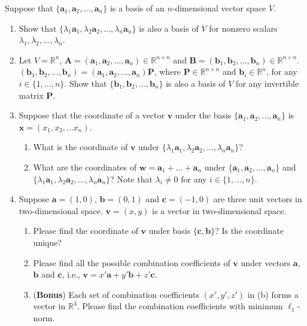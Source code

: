 \documentclass[11pt,letter,notitlepage]{article}
\theoremstyle{definition}
\begin{document}
\newpage
	\begin{exercise}
		Suppose that $\{\mathbf{a}_1, \mathbf{a}_2,\dots,\mathbf{a}_n\}$ is a basis of an $n$-dimensional vector space $V$.
		\begin{enumerate}
			\item Show that $\{\lambda_1 \mathbf{a}_1, \lambda_2 \mathbf{a}_2, \dots, \lambda_n\mathbf{a}_n\}$ is also a basis of $V$ for nonzero scalars $\lambda_1,\lambda_2, \dots, \lambda_n$.
			\item Let $V =\mathbb{R}^n$, $\mathbf{A}=(\mathbf{a}_1,\mathbf{a}_2, \dots, \mathbf{a}_n)\in\mathbb{R}^{n\times n}$ and $\mathbf{B}=(\mathbf{b}_1,\mathbf{b}_2,\dots, \mathbf{b}_n)\in\mathbb{R}^{n\times n}$. $(\mathbf{b}_1,\mathbf{b}_2,\dots, \mathbf{b}_n) = (\mathbf{a}_1,\mathbf{a}_2, \dots, \mathbf{a}_n)\mathbf{P}$, where $\mathbf{P}\in \mathbb{R}^{n\times n}$ and $\mathbf{b}_i\in \mathbb{R}^n$, for any $i\in\{1,\dots,n\}$. Show that $\{ \mathbf{b}_1, \mathbf{b}_2, \dots, \mathbf{b}_n\}$ is also a basis of $V$ for any invertible  matrix $\mathbf{P}$.
			\item Suppose that the coordinate of a vector $\mathbf{v}$ under the basis $\{\mathbf{a}_1,  \mathbf{a}_2,\dots,\mathbf{a}_n\}$ is $\mathbf{x}=(x_1,x_2,\dots x_n)$.
			\begin{enumerate}
				\item What is the coordinate of $\mathbf{v}$ under $\{\lambda_1 \mathbf{a}_1, \lambda_2 \mathbf{a}_2, \dots, \lambda_n\mathbf{a}_n\}$?
				
				\item What are the coordinates of $\mathbf{w} = \mathbf{a}_1+\dots + \mathbf{a}_n$ under $\{\mathbf{a}_1, \mathbf{a}_2,\dots,\mathbf{a}_n\}$ and $\{\lambda_1 \mathbf{a}_1, \lambda_2 \mathbf{a}_2, \dots, \lambda_n\mathbf{a}_n\}$? Note that  $\lambda_i \neq 0$ for any $i\in \{1,\dots,n\}$.
			\end{enumerate}

                \item Suppose $\mathbf{a}=(1,0)$, $\mathbf{b}=(0,1)$ and $\mathbf{c}=(-1,0)$ are three unit vectors in two-dimensional space. $\mathbf{v}=(x,y)$ is a vector in two-dimensional space.
                \begin{enumerate}
                    \item Please find the coordinate of $\mathbf{v}$ under basis $\{\mathbf{c}, \mathbf{b}\}$? Is the coordinate unique?
                    \item Please find all the possible combination coefficients of $\mathbf{v}$ under vectors $\mathbf{a}$, $\mathbf{b}$ and $\mathbf{c}$, i.e., $\mathbf{v} = x'\mathbf{a}+y'\mathbf{b}+z'\mathbf{c}$. 
                    \item (\textbf{Bonus}) Each set of combination coefficients $(x',y',z')$ in (b) forms a vector in $\mathbb{R}^3$. Please find the combination coefficients with minimum $\ell_1$-norm.
                \end{enumerate}

		\end{enumerate}
	\end{exercise}	
\end{document}
